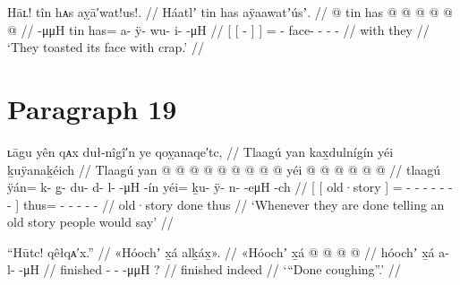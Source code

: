 \ex\label{ex:91-281-toast-with-crap}%
%
\begingl
	\glpreamble	Hāʟ! tîn hᴀs aỵā′wat!us!. //
	\glpreamble	Háatlʼ tin has aÿaawatʼúsʼ. //
	\gla	{} {}  @ {} {} tin {}
		has @  @ {} @ {} @ {} @ {} @ {} //
	\glb	{} {}  -μμH {} tin {}
		has= a- ÿ- wu- i-  -μH //
	\glc	{}[ {}[  - {}]  {}]
		= - face- - -  - //
	\gld	{} {}  {} {} with {}
		they  {} {} {} {} {} //
	\glft	‘They toasted its face with crap.’
		//
\endgl
\xe

\section{Paragraph 19}\label{sec:91-para-19}

\ex\label{ex:91-282-whenever-done-telling-people-say}%
%
\begingl
	\glpreamble	ʟāgu yên qᴀx duł-nîgî′n ye qoỵanaqe′tc, //
	\glpreamble	Tlaagú yan kax̱dulnígín yéi ḵuÿanaḵéich //
	\gla	{} {} Tlaagú {}
			yan @  @ {} @ {} @ {} @ {} @ {} @ {} @ {} @ {} {}
		yéi @  @ {} @ {} @ {} @ {} @ {} //
	\glb	{} {} tlaagú {} ÿán= k- {} g̱- du- d- l-  -μH -ín {}
		yéi= ḵu- ÿ- n-  -eμH -ch //
	\glc	{}[ {}[ old·story {}]
			= - \· -
				- - - 
					- - {}]
		thus= - - -  - - //
	\gld	{} {} old·story {} done
			 {} {} {} {} {} {} {} {} {}
		thus  {} {} {} {} {} //
	\glft	‘Whenever they are done telling an old story people would say’
		//
\endgl
\xe


\ex\label{ex:91-283-done-coughing}%
%
\begingl
	\glpreamble	“Hūtc! qêłqᴀ′x.” //
	\glpreamble	«\!Hóochʼ x̱á alḵáx̱\!». //
	\gla	«\!Hóochʼ x̱á  @ {} @ {} @ {} @ {} //
	\glb	\pqp{}hóochʼ x̱á a- l-  -μH {} //
	\glc	\pqp{}finished  - -  -μμH \·? //
	\gld	\pqp{}finished indeed  {} {} {} {} //
	\glft	‘“Done coughing”.’
		//
\endgl
\xe

